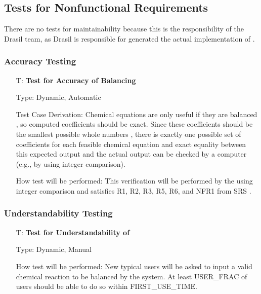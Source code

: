 \documentclass[12pt, titlepage]{article}
\newcounter{testnum} %
\begin{document}
\subsection{Tests for Nonfunctional Requirements}

There are no tests for maintainability because this is the responsibility of
the Drasil team, as Drasil is responsible for generated the actual
implementation of \progname{}.

\subsubsection{Accuracy Testing}

\begin{enumerate}

  \item[T\refstepcounter{testnum}\thetestnum \label{test_bal_accuracy}:]
    \textbf{Test for Accuracy of Balancing}

    Type: Dynamic, Automatic

    Test Case Derivation: Chemical equations are only useful if they are
    balanced \cite{lund_introduction_2023}, so computed coefficients should be
    exact. Since these coefficients should be the smallest possible whole
    numbers \cite{lund_introduction_2023}, there is exactly one possible set of
    coefficients for each feasible chemical equation and exact equality between
    this expected output and the actual output can be checked by a computer
    (e.g., by using integer comparison).

    How test will be performed: This verification will be performed by
    the  using integer comparison and satisfies R1, R2,
    R3, R5, R6, and NFR1 from SRS .

\end{enumerate}

\subsubsection{Understandability Testing}

\begin{enumerate}

  \item[T\refstepcounter{testnum}\thetestnum \label{test_understand}:]
    \textbf{Test for Understandability of \progname{}}

    Type: Dynamic, Manual

    How test will be performed: New typical users will be asked to input a
    valid chemical reaction to be balanced by the system. At least
    USER\_FRAC of users should be able to do so within
    FIRST\_USE\_TIME.

\end{enumerate}
\end{document}
